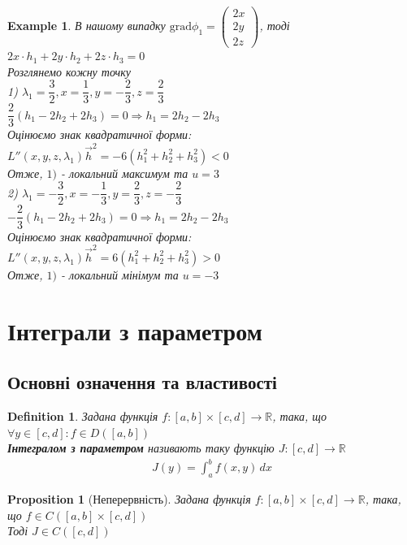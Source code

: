 \documentclass[a4paper, 14pt]{extarticle}
\def\bigline{\vspace{5mm}\\}
\theoremstyle{theoremdd}
\theoremstyle{theoremdd}
\newtheorem{definition}[theorem]{Definition}
\theoremstyle{theoremdd}
\theoremstyle{theoremdd}
\newtheorem{example}[theorem]{Example}
\theoremstyle{theoremdd}
\newtheorem{proposition}[theorem]{Proposition}
\theoremstyle{theoremdd}
\theoremstyle{theoremdd}
\theoremstyle{theoremdd}
\begin{document}
\begin{example}
В нашому випадку $\textrm{grad} \phi_1 = \begin{pmatrix}
2x \\ 2y \\ 2z
\end{pmatrix}$, тоді\\
$2x \cdot h_1 + 2y \cdot h_2 + 2z \cdot h_3 = 0$\\
Розглянемо кожну точку\\
1) $\lambda_1 = \dfrac{3}{2}, x = \dfrac{1}{3}, y = -\dfrac{2}{3}, z = \dfrac{2}{3}$\\
$\dfrac{2}{3} \left(h_1 - 2h_2 + 2h_3 \right) = 0 \Rightarrow h_1 = 2h_2 - 2h_3$\\
Оцінюємо знак квадратичної форми:\\
$L''(x,y,z,\lambda_1) \vec{h}^2 = -6(h_1^2+h_2^2+h_3^2) < 0$\\
Отже, $1)$ - локальний максимум та $u = 3$
\bigline
2) $\lambda_1 = -\dfrac{3}{2}, x = -\dfrac{1}{3}, y = \dfrac{2}{3}, z = -\dfrac{2}{3}$\\
$-\dfrac{2}{3} \left(h_1 - 2h_2 + 2h_3 \right) = 0 \Rightarrow h_1 = 2h_2 - 2h_3$\\
Оцінюємо знак квадратичної форми:\\
$L''(x,y,z,\lambda_1) \vec{h}^2 = 6(h_1^2+h_2^2+h_3^2) > 0$\\
Отже, $1)$ - локальний мінімум та $u = -3$

\end{example}
\newpage

\section{Інтеграли з параметром}
\subsection{Основні означення та властивості}
\begin{definition}
Задана функція $f: [a,b] \times [c,d] \to \mathbb{R}$, така, що \\ $\forall y \in [c,d]: f \in D([a,b])$\\
\textbf{Інтегралом з параметром} називають таку функцію $J: [c,d] \to \mathbb{R}$
\begin{align*}
J(y) = \int_a^b f(x,y)\,dx
\end{align*}
\end{definition}

\begin{proposition}[Неперервність]
Задана функція $f: [a,b] \times [c,d] \to \mathbb{R}$, така, що $f \in C([a,b] \times [c,d])$\\
Тоді $J \in C([c,d])$
\end{proposition}
\end{document}
